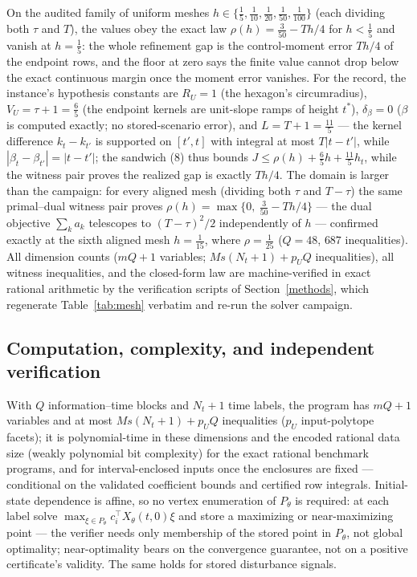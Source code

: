 \documentclass[10pt,twocolumn]{article}
\theoremstyle{plain}
\theoremstyle{definition}
\theoremstyle{remark}
\begin{document}
On the audited family of uniform meshes \(h \in \{\tfrac15,
\tfrac1{10}, \tfrac1{20}, \tfrac1{50}, \tfrac1{100}\}\) (each dividing
both \(\tau\) and \(T\)), the values obey the exact law \(\rho(h) =
\tfrac{3}{50} - Th/4\) for \(h < \tfrac15\) and vanish at \(h =
\tfrac15\): the whole refinement gap is the control-moment error \(Th/4\)
of the endpoint rows, and the floor at zero says the finite value cannot
drop below the exact continuous margin once the moment error vanishes.
For the record, the instance's hypothesis constants are
\(R_U = 1\) (the hexagon's circumradius), \(V_U = \tau + 1 = \tfrac65\)
(the endpoint kernels are unit-slope ramps of height \(t^{*}\)),
\(\delta_\beta = 0\) (\(\beta\) is computed exactly; no stored-scenario
error), and \(L = T + 1 = \tfrac{11}{5}\) --- the kernel difference
\(k_t - k_{t'}\) is supported on \([t', t]\) with integral at most
\(T|t - t'|\), while \(|\beta_t - \beta_{t'}| = |t - t'|\); the
sandwich (8) thus bounds \(J \le \rho(h) + \tfrac65 h + \tfrac{11}{5}
h_t\), while the witness pair proves the realized gap is exactly
\(Th/4\). The domain is larger than the campaign: for every aligned mesh
(dividing both \(\tau\) and \(T - \tau\)) the same primal--dual witness
pair proves \(\rho(h) = \max\{0,\ \tfrac{3}{50} - Th/4\}\) --- the dual
objective \(\sum_k a_k\) telescopes to \((T-\tau)^2/2\) independently of
\(h\) --- confirmed exactly at the sixth aligned mesh \(h = \tfrac1{15}\),
where \(\rho = \tfrac1{25}\) (\(Q = 48\), \(687\) inequalities). All dimension counts
(\(mQ + 1\) variables; \(Ms(N_t{+}1) + p_U Q\) inequalities), all witness
inequalities, and the closed-form law are machine-verified in exact rational
arithmetic by the verification scripts of Section~\ref{methods}, which
regenerate Table~\ref{tab:mesh} verbatim and re-run the solver campaign.

\subsection{Computation, complexity, and independent verification}\label{computation}

With \(Q\) information--time blocks and \(N_t + 1\) time labels, the program
has \(mQ + 1\) variables and at most \(Ms(N_t{+}1) + p_U Q\) inequalities
(\(p_U\) input-polytope facets); it is polynomial-time in these dimensions and the encoded rational data
size (weakly polynomial bit complexity) for the exact rational benchmark
programs, and for interval-enclosed inputs once the enclosures are fixed ---
conditional on the validated coefficient bounds and certified row
integrals.
Initial-state dependence is affine, so no vertex enumeration of \(P_\theta\)
is required: at each label solve
\(\max_{\xi \in P_\theta} c_i^\top X_\theta(t,0)\xi\) and store a maximizing
or near-maximizing point --- the verifier needs only membership of the stored
point in \(P_\theta\), not global optimality; near-optimality bears on the
convergence guarantee, not on a positive certificate's validity. The same
holds for stored disturbance signals.
\end{document}
